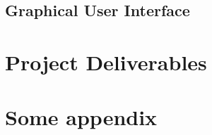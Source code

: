 \documentclass[a4paper,11pt]{report}
\begin{document}
\section{Graphical User Interface}

\chapter{Project Deliverables}
\label{chap:deliverables}

\nocite{*}

\clearpage
{}
{}





\appendix


\chapter{Some appendix}


\end{document}
